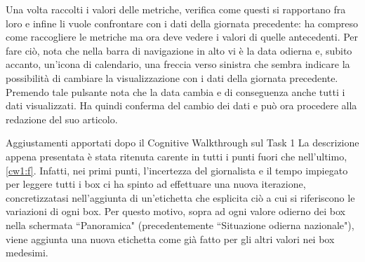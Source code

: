 Una volta raccolti i valori delle metriche, verifica come questi si rapportano fra loro e infine li vuole confrontare con i dati della giornata precedente: ha compreso come raccogliere le metriche ma ora deve vedere i valori di quelle antecedenti.
Per fare ciò, nota che nella barra di navigazione in alto vi è la data odierna e, subito accanto, un'icona di calendario, una freccia verso sinistra che sembra indicare la possibilità di cambiare la visualizzazione con i dati della giornata precedente.
Premendo tale pulsante nota che la data cambia e di conseguenza anche tutti i dati visualizzati.
Ha quindi conferma del cambio dei dati e può ora procedere alla redazione del suo articolo.

\begin{bclogo}{Aggiustamenti apportati dopo il Cognitive Walkthrough sul Task 1}
    La descrizione appena presentata è stata ritenuta carente in tutti i punti fuori che nell'ultimo, \ref{cw1:f}.
    Infatti, nei primi punti, l'incertezza del giornalista e il tempo impiegato per leggere tutti i box ci ha spinto ad effettuare una nuova iterazione, concretizzatasi nell'aggiunta di un'etichetta che esplicita ciò a cui si riferiscono le variazioni di ogni box.
    Per questo motivo, sopra ad ogni valore odierno dei box nella schermata ``Panoramica" (precedentemente ``Situazione odierna nazionale"), viene aggiunta una nuova etichetta come già fatto per gli altri valori nei box medesimi.
\end{bclogo}